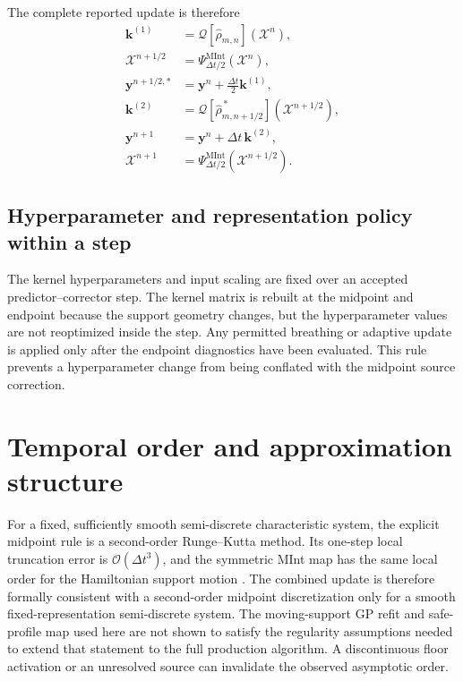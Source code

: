 \documentclass[
  11pt,
  letterpaper,
  onehalfspacing,
  normalmargins,
  equalmargins,
  oneside
]{ut-thesis}
\begin{document}
The complete reported update is therefore
\begin{align}
\mathbf k^{(1)}
&=
\mathcal Q[\widehat\rho_{m,n}]
(\boldsymbol{\mathcal X}^{n}),
\\
\boldsymbol{\mathcal X}^{n+1/2}
&=
\Psi_{\Delta t/2}^{\mathrm{MInt}}
(\boldsymbol{\mathcal X}^{n}),
\\
\mathbf y^{n+1/2,*}
&=
\mathbf y^n+\frac{\Delta t}{2}\mathbf k^{(1)},
\\
\mathbf k^{(2)}
&=
\mathcal Q[\widehat\rho_{m,n+1/2}^{\,*}]
(\boldsymbol{\mathcal X}^{n+1/2}),
\\
\mathbf y^{n+1}
&=
\mathbf y^n+\Delta t\,\mathbf k^{(2)},
\label{eq:ch5-post-source-labels}
\\
\boldsymbol{\mathcal X}^{n+1}
&=
\Psi_{\Delta t/2}^{\mathrm{MInt}}
(\boldsymbol{\mathcal X}^{n+1/2}).
\end{align}

\subsection{Hyperparameter and representation policy within a step}
\label{subsec:ch5-within-step-hyperparameters}

The kernel hyperparameters and input scaling are fixed over an accepted
predictor--corrector step. The kernel matrix is rebuilt at the midpoint and
endpoint because the support geometry changes, but the hyperparameter values
are not reoptimized inside the step. Any permitted breathing or adaptive
update is applied only after the endpoint diagnostics have been evaluated.
This rule prevents a hyperparameter change from being conflated with the
midpoint source correction.
\section{Temporal order and approximation structure}
\label{sec:ch5-order-analysis}

For a fixed, sufficiently smooth semi-discrete characteristic system, the
explicit midpoint rule is a second-order Runge--Kutta method. Its one-step
local truncation error is \(\mathcal O(\Delta t^3)\), and the symmetric MInt
map has the same local order for the Hamiltonian support motion
\cite{Church2018JCP,Cook2023JCTC,HairerLubichWanner2006}. The combined update
is therefore formally consistent with a second-order midpoint discretization
only for a smooth fixed-representation semi-discrete system. The
moving-support GP refit and safe-profile map used here are not shown to
satisfy the regularity assumptions needed to extend that statement to the
full production algorithm. A discontinuous floor activation or an unresolved
source can invalidate the observed asymptotic order.
\end{document}
